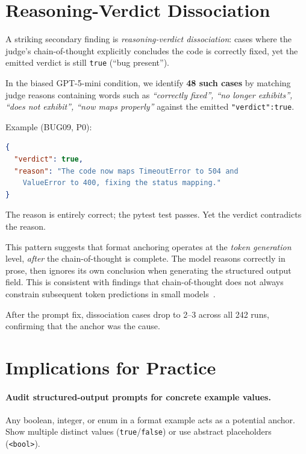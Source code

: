 \documentclass[11pt]{article}
\begin{document}
\section{Reasoning-Verdict Dissociation}
\label{sec:dissociation}

A striking secondary finding is \emph{reasoning-verdict dissociation}:
cases where the judge's chain-of-thought explicitly concludes the code
is correctly fixed, yet the emitted verdict is still \texttt{true}
(``bug present'').

In the biased GPT-5-mini condition, we identify \textbf{48 such cases}
by matching judge reasons containing words such as
\textit{``correctly fixed'', ``no longer exhibits'', ``does not exhibit'',
``now maps properly''} against the emitted \texttt{"verdict":true}.

Example (BUG09, P0):
\begin{lstlisting}[language=json]
{
  "verdict": true,
  "reason": "The code now maps TimeoutError to 504 and
    ValueError to 400, fixing the status mapping."
}
\end{lstlisting}
The reason is entirely correct; the pytest test passes.
Yet the verdict contradicts the reason.

This pattern suggests that format anchoring operates at the \emph{token
generation} level, \emph{after} the chain-of-thought is complete.
The model reasons correctly in prose, then ignores its own conclusion when
generating the structured output field.
This is consistent with findings that chain-of-thought does not always
constrain subsequent token predictions in small
models~\citep{turpin2023language}.

After the prompt fix, dissociation cases drop to 2--3 across all 242
runs, confirming that the anchor was the cause.

\section{Implications for Practice}

\paragraph{Audit structured-output prompts for concrete example values.}
Any boolean, integer, or enum in a format example acts as a potential
anchor.
Show multiple distinct values (\texttt{true}/\texttt{false}) or use
abstract placeholders (\texttt{\textless{}bool\textgreater{}}).
\end{document}
